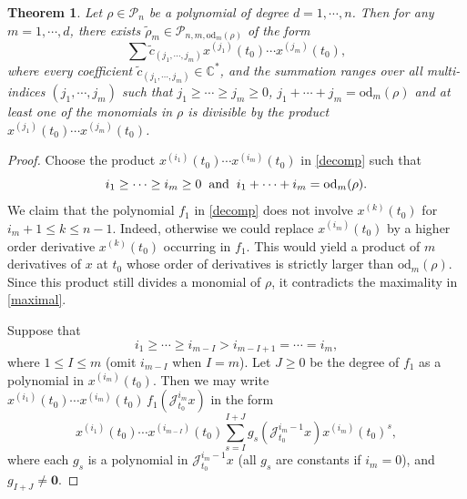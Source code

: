 \documentclass[11pt]{amsart}
\numberwithin{equation}{section}
\newtheorem{thm}{Theorem}[section]
\newcommand{\bc}{\mathbb{C}}
\newcommand{\sd}{\mathrm{od}}
\newcommand{\scp}{\mathscr{P}}
\newcommand{\sjt}{\mathscr{J}_{t_0}}
\newcommand{\sjimx}{\mathscr{J}^{i_m}_{t_0} x}
\newcommand{\pn}{\mathscr{P}_{n}}
\newcommand{\zero}{\mathbf{0}}
\begin{document}
\begin{thm}
  \label{monomial}
  Let $\rho \in \pn$ be a polynomial of degree $d=1, \cdots, n$.
  Then for any $m=1, \cdots, d$, there exists $\tilde{\rho}_m \in \scp_{n, m, \sd_m(\rho)}$ of the form
    \begin{equation} \label{m}
    \sum \tilde{c}_{(j_1, \cdots, j_m)}x^{(j_1)}(t_0) \cdots x^{(j_m)}(t_0),
    \end{equation}
    where every
    coefficient $\tilde{c}_{(j_1, \cdots, j_m)} \in \bc^{\ast}$,
    and
    the summation ranges over all multi-indices $(j_1, \cdots, j_m)$ such that
    $j_1  \ge \cdots \ge j_m \ge 0$, $j_1+\cdots+j_m=\sd_m(\rho)$
     and at least one of the monomials in $\rho$ is divisible by
    the product $x^{(j_1)}(t_0) \cdots x^{(j_m)}(t_0)$.
\end{thm}
\begin{proof}
Choose the product
\(x^{(i_1)}(t_0)\cdots x^{(i_m)}(t_0)\)
in \eqref{decomp} such that
\begin{equation}\label{maximal}
i_1  \ge \cdots \ge i_m \ge 0 \hspace{2mm} \text{and} \hspace{2mm}  i_1+\cdots+i_m=\sd_m(\rho).
\end{equation}
We claim that the polynomial \(f_1\) in \eqref{decomp} does not involve \(x^{(k)}(t_0)\) for \(i_m+1\le k\le n-1\).
Indeed, otherwise we could replace \(x^{(i_m)}(t_0)\) by a higher order derivative \(x^{(k)}(t_0)\) occurring in \(f_1\). This would yield a product of \(m\) derivatives of \(x\) at \(t_0\) whose order of
 derivatives is strictly larger than \(\sd_m(\rho)\). Since this product still divides a monomial of \(\rho\), it contradicts the maximality in \eqref{maximal}.

  Suppose that
\[
i_1\ge\cdots\ge i_{m-I}>i_{m-I+1}=\cdots=i_m,
\]
where \(1\le I\le m\) (omit \(i_{m-I}\) when \(I=m\)).
Let \(J\ge 0\) be the degree of \(f_1\) as a polynomial in \(x^{(i_m)}(t_0)\).
Then we may write
\(x^{(i_1)}(t_0)\cdots x^{(i_m)}(t_0)\, f_1(\sjimx)\)
in the form
  \begin{equation} \label{gpaction}
  x^{(i_1)}(t_0) \cdots x^{(i_{m-I})}(t_0) \sum_{s=I}^{I+J}   g_s(\sjt^{i_m-1}x) x^{(i_m)}(t_0)^s,
  \end{equation}
  where each \(g_s\) is a polynomial in $\sjt^{i_m-1} x$ (all \(g_s\) are constants if \(i_m=0\)), and \(g_{I+J}\neq \zero\).


\end{proof}
\end{document}
